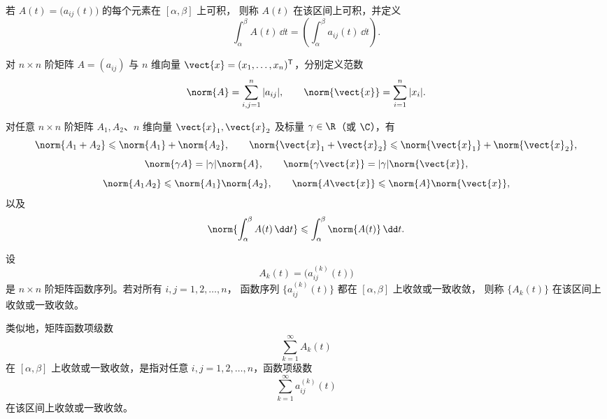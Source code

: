 若 $A(t)=\bigl(a_{ij}(t)\bigr)$ 的每个元素在 $[\alpha,\beta]$ 上可积，
则称 $A(t)$ 在该区间上可积，并定义
\[
	\int_\alpha^\beta A(t)\,\dd t
	=\left(\int_\alpha^\beta a_{ij}(t)\,\dd t\right).
\]

\begin{definition}\label{def:矩阵与向量的范数}
	对 $n\times n$ 阶矩阵 $A=(a_{ij})$ 与 $n$ 维向量
	$\vect{x}=(x_1,\ldots,x_n)^{\mathsf T}$，分别定义范数
	\[
		\norm{A}=\sum_{i,j=1}^{n}|a_{ij}|,
		\qquad
		\norm{\vect{x}}=\sum_{i=1}^{n}|x_i|.
	\]
\end{definition}

对任意 $n\times n$ 阶矩阵 $A_1,A_2$、$n$ 维向量
$\vect{x}_1,\vect{x}_2$ 及标量 $\gamma\in\R$（或 $\C$），有
\[
	\norm{A_1+A_2}\leqslant\norm{A_1}+\norm{A_2},
	\qquad
	\norm{\vect{x}_1+\vect{x}_2}
	\leqslant\norm{\vect{x}_1}+\norm{\vect{x}_2},
\]
\[
	\norm{\gamma A}=|\gamma|\norm{A},
	\qquad
	\norm{\gamma\vect{x}}=|\gamma|\norm{\vect{x}},
\]
\[
	\norm{A_1A_2}\leqslant\norm{A_1}\norm{A_2},
	\qquad
	\norm{A\vect{x}}\leqslant\norm{A}\norm{\vect{x}},
\]
以及
\[
	\norm{\int_\alpha^\beta A(t)\,\dd t}
	\leqslant
	\int_\alpha^\beta\norm{A(t)}\,\dd t.
\]

\begin{definition}\label{def:矩阵函数序列的收敛}
	设
	\[
		A_k(t)=\bigl(a_{ij}^{(k)}(t)\bigr)
	\]
	是 $n\times n$ 阶矩阵函数序列。若对所有 $i,j=1,2,\ldots,n$，
	函数序列 $\{a_{ij}^{(k)}(t)\}$ 都在 $[\alpha,\beta]$ 上收敛或一致收敛，
	则称 $\{A_k(t)\}$ 在该区间上收敛或一致收敛。

	类似地，矩阵函数项级数
	\[
		\sum_{k=1}^{\infty}A_k(t)
	\]
	在 $[\alpha,\beta]$ 上收敛或一致收敛，是指对任意
	$i,j=1,2,\ldots,n$，函数项级数
	\[
		\sum_{k=1}^{\infty}a_{ij}^{(k)}(t)
	\]
	在该区间上收敛或一致收敛。
\end{definition}

